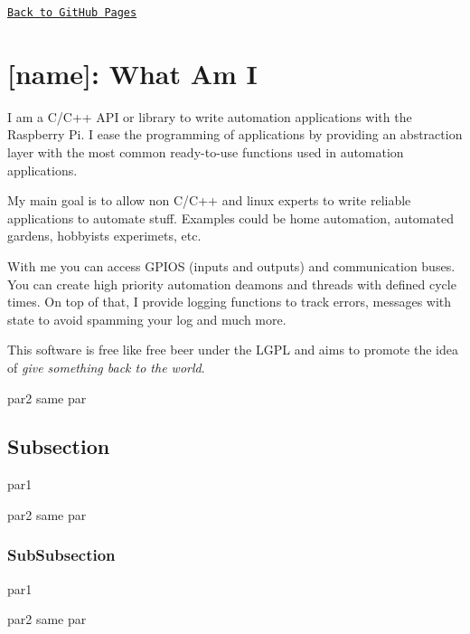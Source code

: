 \href{https://pettitpeon.github.io/rpiapi/}{\tt Back to Git\+Hub Pages}~\newline
 \hypertarget{invstDoku_title}{}\section{\mbox{[}name\mbox{]}\+: What Am I       }\label{invstDoku_title}
I am a C/\+C++ A\+P\+I or library to write automation applications with the Raspberry Pi. I ease the programming of applications by providing an abstraction layer with the most common ready-\/to-\/use functions used in automation applications.

My main goal is to allow non C/\+C++ and linux experts to write reliable applications to automate stuff. Examples could be home automation, automated gardens, hobbyists\textquotesingle{} experimets, etc.

With me you can access G\+P\+I\+O\+S (inputs and outputs) and communication buses. You can create high priority automation deamons and threads with defined cycle times. On top of that, I provide logging functions to track errors, messages with state to avoid spamming your log and much more.

This software is free like free beer under the L\+G\+P\+L and aims to promote the idea of {\itshape give something back to the world}.

par2 same par\hypertarget{invstDoku_sub1}{}\subsection{Subsection       }\label{invstDoku_sub1}
par1

par2 same par\hypertarget{invstDoku_subsub1}{}\subsubsection{Sub\+Subsection}\label{invstDoku_subsub1}
par1

par2 same par 